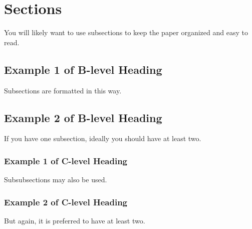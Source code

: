 \section{Sections}
\label{sec:sections}

You will likely want to use subsections to keep the paper organized and easy to read.

\subsection{Example 1 of B-level Heading}

Subsections are formatted in this way.

\subsection{Example 2 of B-level Heading}

If you have one subsection, ideally you should have at least two.

\subsubsection{Example 1 of C-level Heading}

Subsubsections may also be used.

\subsubsection{Example 2 of C-level Heading}

But again, it is preferred to have at least two.



